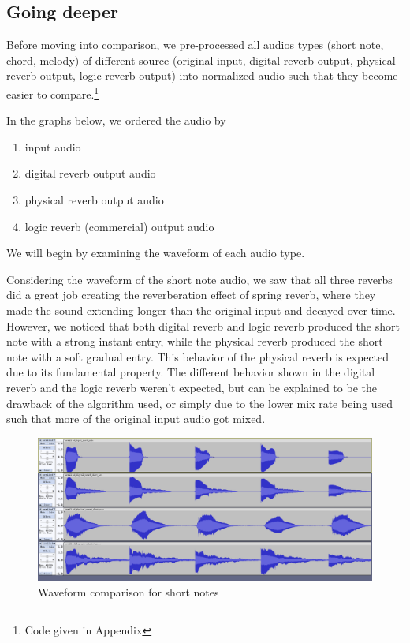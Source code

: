 \documentclass[12pt]{article}
\begin{document}
\subsection{Going deeper}
Before moving into comparison, we pre-processed all audios types (short note, chord, melody) of different source (original input, digital reverb output, physical reverb output, logic reverb output) into normalized audio such that they become easier to compare.\footnote{Code given in Appendix}

In the graphs below, we ordered the audio by 
\begin{enumerate}
    \item input audio
    \item digital reverb output audio
    \item physical reverb output audio
    \item logic reverb (commercial) output audio
\end{enumerate}

We will begin by examining the waveform of each audio type.\newpage

Considering the waveform of the short note audio, we saw that all three reverbs did a great job creating the reverberation effect of spring reverb, where they made the sound extending longer than the original input and decayed over time. However, we noticed that both digital reverb and logic reverb produced the short note with a strong instant entry, while the physical reverb produced the short note with a soft gradual entry. This behavior of the physical reverb is expected due to its fundamental property. The different behavior shown in the digital reverb and the logic reverb weren't expected, but can be explained to be the drawback of the algorithm used, or simply due to the lower mix rate being used such that more of the original input audio got mixed.

\begin{figure}[h]
	\center
	\includegraphics[width=\linewidth]{audio_comparison/short_note_comparison_wave.png}
	\caption{Waveform comparison for short notes}
\end{figure}
\end{document}
